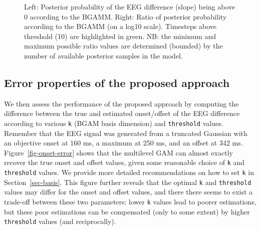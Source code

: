 \documentclass[
  doc,
  floatsintext,
  longtable,
  a4paper,
  nolmodern,
  notxfonts,
  notimes,
  donotrepeattitle,
  colorlinks=true,linkcolor=blue,citecolor=blue,urlcolor=blue]{apa7}
\begin{document}
\begin{figure}[!htb]

\caption{\label{fig-post-prob-ratio}Left: Posterior probability of the
EEG difference (slope) being above 0 according to the BGAMM. Right:
Ratio of posterior probability according to the BGAMM (on a log10
scale). Timesteps above threshold (10) are highlighted in green. NB: the
minimum and maximum possible ratio values are determined (bounded) by
the number of available posterior samples in the model.}


\end{figure}%

\newpage

\subsection{Error properties of the proposed
approach}\label{error-properties-of-the-proposed-approach}

We then assess the performance of the proposed approach by computing the
difference between the true and estimated onset/offset of the EEG
difference according to various \texttt{k} (BGAM basis dimension) and
\texttt{threshold} values. Remember that the EEG signal was generated
from a truncated Gaussian with an objective onset at 160 ms, a maximum
at 250 ms, and an offset at 342 ms. Figure~\ref{fig-onset-error} shows
that the multilevel GAM can almost exactly recover the true onset and
offset values, given some reasonable choice of \texttt{k} and
\texttt{threshold} values. We provide more detailed recommendations on
how to set \texttt{k} in Section~\ref{sec-basis}. This figure further
reveals that the optimal \texttt{k} and \texttt{threshold} values may
differ for the onset and offset values, and there there seems to exist a
trade-off between these two parameters: lower \texttt{k} values lead to
poorer estimations, but these poor estimations can be compensated (only
to some extent) by higher \texttt{threshold} values (and reciprocally).
\end{document}
